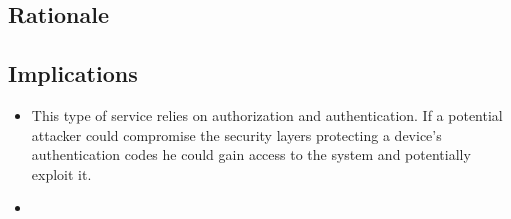 	\subsection{Rationale} \label{trustedP:rationale}

	\subsection{Implications}
	\begin{itemize}

		\item This type of service relies on authorization and authentication. If a potential attacker could compromise the security layers protecting a device's authentication codes he could gain access to the system and potentially exploit it.
	  	\item 
	\end{itemize}

